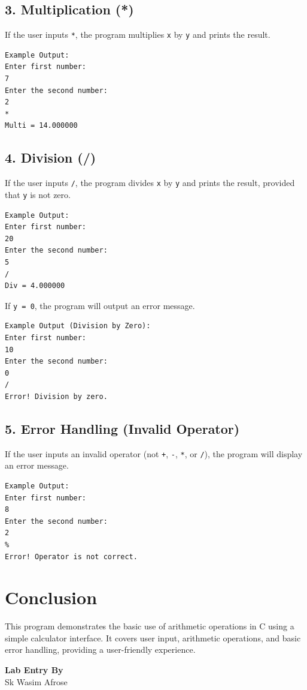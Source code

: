 \documentclass[a4paper,14pt]{article}
\begin{document}
\subsection*{3. Multiplication (*)}
If the user inputs \texttt{*}, the program multiplies \texttt{x} by \texttt{y} and prints the result.
\begin{verbatim}
Example Output:
Enter first number: 
7 
Enter the second number: 
2 
* 
Multi = 14.000000
\end{verbatim}

\subsection*{4. Division (/)}
If the user inputs \texttt{/}, the program divides \texttt{x} by \texttt{y} and prints the result, provided that \texttt{y} is not zero.
\begin{verbatim}
Example Output:
Enter first number: 
20 
Enter the second number: 
5 
/ 
Div = 4.000000
\end{verbatim}

If \texttt{y = 0}, the program will output an error message.
\begin{verbatim}
Example Output (Division by Zero):
Enter first number: 
10 
Enter the second number: 
0 
/ 
Error! Division by zero.
\end{verbatim}

\subsection*{5. Error Handling (Invalid Operator)}
If the user inputs an invalid operator (not \texttt{+}, \texttt{-}, \texttt{*}, or \texttt{/}), the program will display an error message.
\begin{verbatim}
Example Output:
Enter first number: 
8 
Enter the second number: 
2 
% 
Error! Operator is not correct.
\end{verbatim}

\section*{Conclusion}
This program demonstrates the basic use of arithmetic operations in C using a simple calculator interface. It covers user input, arithmetic operations, and basic error handling, providing a user-friendly experience.

\vspace{250pt}
\begin{center}
\textbf{Lab Entry By}\\
Sk Wasim Afrose
\end{center}
\end{document}
